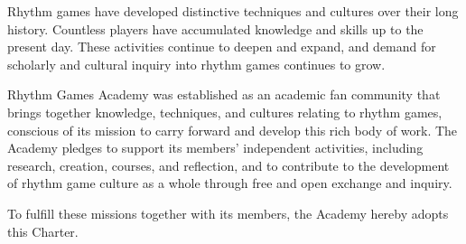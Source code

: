 Rhythm games have developed distinctive techniques and cultures over their long history. Countless players have accumulated knowledge and skills up to the present day. These activities continue to deepen and expand, and demand for scholarly and cultural inquiry into rhythm games continues to grow.

Rhythm Games Academy was established as an academic fan community that brings together knowledge, techniques, and cultures relating to rhythm games, conscious of its mission to carry forward and develop this rich body of work. The Academy pledges to support its members' independent activities, including research, creation, courses, and reflection, and to contribute to the development of rhythm game culture as a whole through free and open exchange and inquiry.

To fulfill these missions together with its members, the Academy hereby adopts this Charter.

